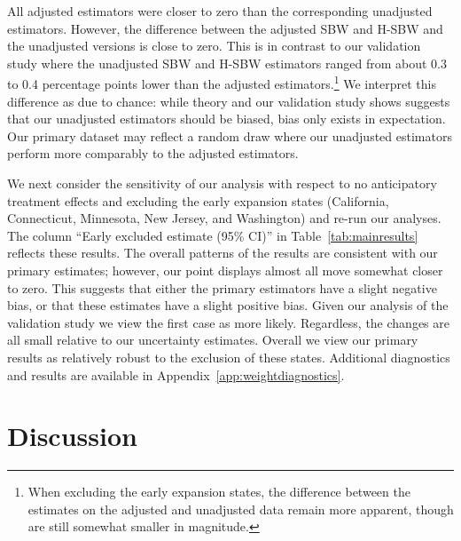 \documentclass[aoas]{imsart}
\theoremstyle{plain}
\theoremstyle{remark}
\begin{document}
All adjusted estimators were closer to zero than the corresponding unadjusted estimators. However, the difference between the adjusted SBW and H-SBW and the unadjusted versions is close to zero. This is in contrast to our validation study where the unadjusted SBW and H-SBW estimators ranged from about 0.3 to 0.4 percentage points lower than the adjusted estimators.\footnote{When excluding the early expansion states, the difference between the estimates on the adjusted and unadjusted data remain more apparent, though are still somewhat smaller in magnitude.} We interpret this difference as due to chance: while theory and our validation study shows suggests that our unadjusted estimators should be biased, bias only exists in expectation. Our primary dataset may reflect a random draw where our unadjusted estimators perform more comparably to the adjusted estimators.

We next consider the sensitivity of our analysis with respect to no anticipatory treatment effects and excluding the early expansion states (California, Connecticut, Minnesota, New Jersey, and Washington) and re-run our analyses. The column ``Early excluded estimate (95\% CI)'' in Table~\ref{tab:mainresults} reflects these results. The overall patterns of the results are consistent with our primary estimates; however, our point displays almost all move somewhat closer to zero. This suggests that either the primary estimators have a slight negative bias, or that these estimates have a slight positive bias. Given our analysis of the validation study we view the first case as more likely. Regardless, the changes are all small relative to our uncertainty estimates. Overall we view our primary results as relatively robust to the exclusion of these states. Additional diagnostics and results are available in Appendix~\ref{app:weightdiagnostics}.


\section{Discussion}
\end{document}
